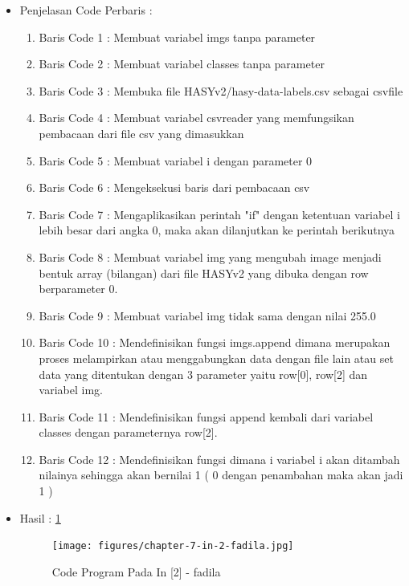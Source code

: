 \begin{enumerate}
\begin{itemize}
\par
\par
\item Penjelasan Code Perbaris	: 
\begin{enumerate}
\item Baris Code 1	: Membuat variabel imgs tanpa parameter
\item Baris Code 2	: Membuat variabel classes tanpa parameter
\item Baris Code 3	: Membuka file HASYv2/hasy-data-labels.csv sebagai csvfile
\item Baris Code 4	: Membuat variabel csvreader yang memfungsikan pembacaan dari file csv yang dimasukkan
\item Baris Code 5	: Membuat variabel i dengan parameter 0
\item Baris Code 6	: Mengeksekusi baris dari pembacaan csv 
\item Baris Code 7	: Mengaplikasikan perintah "if" dengan ketentuan variabel i lebih besar dari angka 0, maka akan dilanjutkan ke perintah berikutnya
\item Baris Code 8	: Membuat variabel img yang mengubah image menjadi bentuk array (bilangan) dari file HASYv2 yang dibuka dengan row berparameter 0.
\item Baris Code 9	: Membuat variabel img tidak sama dengan nilai 255.0
\item Baris Code 10	: Mendefinisikan fungsi imgs.append dimana merupakan proses melampirkan atau menggabungkan data dengan file lain atau set data yang ditentukan dengan 3 parameter yaitu row[0], row[2] dan variabel img.
\item Baris Code 11	: Mendefinisikan fungsi append kembali dari variabel classes dengan parameternya row[2].
\item Baris Code 12	: Mendefinisikan fungsi dimana i variabel i akan ditambah nilainya sehingga akan bernilai 1 ( 0 dengan penambahan maka akan jadi 1 )
\end{enumerate}
\par
\item Hasil : \ref{chapter-7-in-2-fadila}
\par
\par
\begin{figure}[!hbtp]
\centering
\texttt{[image: figures/chapter-7-in-2-fadila.jpg]}
\caption{Code Program Pada In [2] - fadila}
\label{chapter-7-in-2-fadila}
\end{figure}
\par
\par
\end{itemize}

\end{enumerate}
